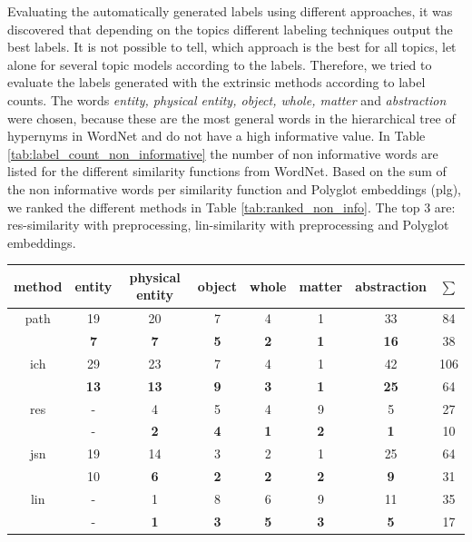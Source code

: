 {\begin{table}
	\label{tab:labeled_extrinsic_and_manually}
\end{table}
Evaluating the automatically generated labels using different approaches, it was discovered that depending on the topics different labeling techniques output the best labels. It is not possible to tell, which approach is the best for all topics, let alone for several topic models according to the labels. Therefore, we tried to evaluate the labels generated with the extrinsic methods according to label counts. The words \textit{entity, physical entity, object, whole, matter} and \textit{abstraction} were chosen, because these are the most general words in the hierarchical tree of hypernyms in WordNet and do not have a high informative value. 
In Table \ref{tab:label_count_non_informative} the number of non informative words are listed for the different similarity functions from WordNet. Based on the sum of the non informative words per similarity function and Polyglot embeddings (plg), we ranked the different methods in Table \ref{tab:ranked_non_info}. The top 3 are: res-similarity with preprocessing, lin-similarity with preprocessing and Polyglot embeddings.
\begin{table}
	\begin{tabular}{c|c|c|c|c|c|c|c}
		method & entity	& physical entity & object & whole & matter & abstraction & $\sum$ \\
		\hline
		path& 19		&20				  &7	   &4      &1       &33 &84\\
		& \textbf{7}&\textbf{7}	 &\textbf{5}  &\textbf{2} &\textbf{1} &\textbf{16} & 38\\
		\hline
		ich& 29		&23				  &7	   &4      &1       &42 & 106\\
		& \textbf{13}&\textbf{13}	 &\textbf{9}  &\textbf{3} &\textbf{1} &\textbf{25} & 64\\
		\hline
		res& -		&4				  &5	   &4      &9       &5 &27\\
		& -			&\textbf{2}	 &\textbf{4}  &\textbf{1} &\textbf{2} &\textbf{1} &10\\
		\hline
		jsn& 19		&14				  &3	   &2      &1       &25 &64\\
		&10 		&\textbf{6}	 &\textbf{2}  &\textbf{2} &\textbf{2} &\textbf{9} &31\\
		\hline
		lin& -		&1				  &8	   &6      &9       &11 &35\\
		& -	 	&\textbf{1}	 &\textbf{3}  &\textbf{5} &\textbf{3} &\textbf{5} &17\\

\end{tabular}
\end{table}}
